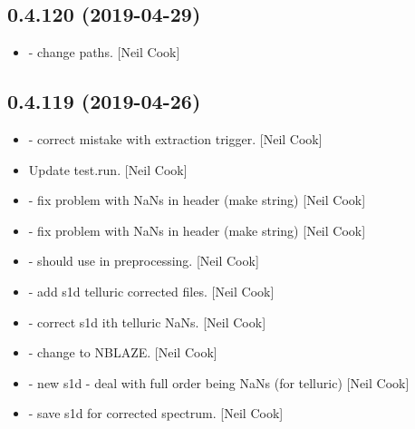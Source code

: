 \documentclass[a4paper,10pt,english]{report}
\begin{document}
\subsection{0.4.120 (2019-04-29)}
\label{\detokenize{misc/changelog:id141}}\begin{itemize}
\item {} 
 - change paths. {[}Neil Cook{]}

\end{itemize}


\subsection{0.4.119 (2019-04-26)}
\label{\detokenize{misc/changelog:id142}}\begin{itemize}
\item {} 
 - correct mistake with extraction trigger. {[}Neil
Cook{]}

\item {} 
Update test.run. {[}Neil Cook{]}

\item {} 
 - fix problem with NaNs in header (make string) {[}Neil
Cook{]}

\item {} 
 - fix problem with NaNs in header (make string) {[}Neil
Cook{]}

\item {} 
 - should use  in preprocessing. {[}Neil
Cook{]}

\item {} 
 - add s1d telluric corrected files. {[}Neil Cook{]}

\item {} 
 - correct s1d ith telluric NaNs. {[}Neil Cook{]}

\item {} 
 - change to NBLAZE. {[}Neil Cook{]}

\item {} 
 - new s1d - deal with full order being NaNs (for
telluric) {[}Neil Cook{]}

\item {} 
 - save s1d for corrected spectrum. {[}Neil Cook{]}


\end{itemize}
\end{document}
